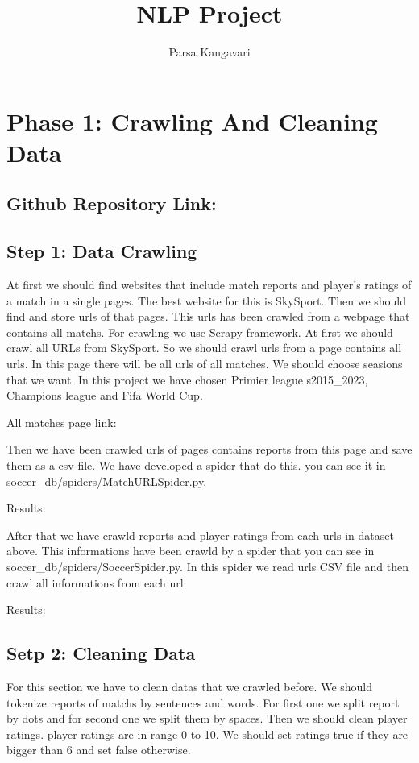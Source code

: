 \documentclass{article}
\title{NLP Project}
\author{Parsa Kangavari}
\begin{document}
 
\maketitle

\section{Phase 1: Crawling And Cleaning Data}

\subsection{Github Repository Link: }


\subsection{Step 1: Data Crawling}
At first we should find websites that include match reports and player's ratings of a match in a single pages. The best website for this is SkySport.
Then we should find and store urls of that pages. This urls has been crawled from a webpage that contains all matchs. For crawling we use Scrapy framework.
At first we should crawl all URLs from SkySport. So we should crawl urls from a page contains all urls. In this page there will be all urls of all matches.
We should choose seasions that we want. In this project we have chosen Primier league s2015_2023, Champions league and Fifa World Cup.

All matches page link:


Then we have been crawled urls of pages contains reports from this page and save them as a csv file. We have developed a spider that do this. you can see it in soccer_db/spiders/MatchURLSpider.py.

Results:


After that we have crawld reports and player ratings from each urls in dataset above. This informations have been crawld by a spider that you can see in soccer_db/spiders/SoccerSpider.py.
In this spider we read urls CSV file and then crawl all informations from each url.

Results: 

\subsection{Setp 2: Cleaning Data}
For this section we have to clean datas that we crawled before. We should tokenize reports of matchs by sentences and words. 
For first one we split report by dots and for second one we split them by spaces. Then we should clean player ratings. player ratings are in range 0 to 10.
We should set ratings true if they are bigger than 6 and set false otherwise.
\end{document}
